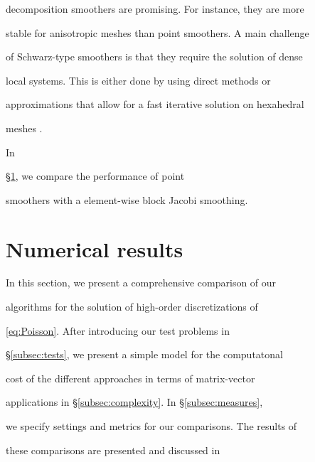 \documentclass[smallcondensed,final]{svjour3}     %
\begin{document}
decomposition smoothers are promising. For instance, they are more

stable for anisotropic meshes than point smoothers. A main challenge

of Schwarz-type smoothers is that they require the solution of dense

local systems.  This is either done by using direct methods or

approximations that allow for a fast iterative solution on hexahedral

meshes \cite{LottesFischer05, FischerLottes05}.





In

\S\ref{sec:numerics}, we compare the performance of point

smoothers with a element-wise block Jacobi smoothing.









\section{Numerical results}\label{sec:numerics}

In this section, we present a comprehensive comparison of our

algorithms for the solution of high-order discretizations of

\eqref{eq:Poisson}.  After introducing our test problems in

\S\ref{subsec:tests}, we present a simple model for the computatonal

cost of the different approaches in terms of matrix-vector

applications in \S\ref{subsec:complexity}. In \S\ref{subsec:measures},

we specify settings and metrics for our comparisons. The results of

these comparisons are presented and discussed in
\end{document}
